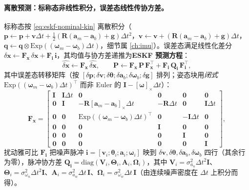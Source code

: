 \paragraph{离散预测：标称态非线性积分，误差态线性传协方差。}
标称态按 \cref{eq:eskf-nominal-kin} 离散积分（$\mathbf{p}\!\leftarrow\!\mathbf{p}+\mathbf{v}\Delta t+\tfrac12(\mathbf{R}(\mathbf{a}_m-\mathbf{a}_b)+\mathbf{g})\Delta t^2$，$\mathbf{v}\!\leftarrow\!\mathbf{v}+(\mathbf{R}(\mathbf{a}_m-\mathbf{a}_b)+\mathbf{g})\Delta t$，$\mathbf{q}\!\leftarrow\!\mathbf{q}\otimes\mathrm{Exp}((\boldsymbol{\omega}_m-\boldsymbol{\omega}_b)\Delta t)$，细节属 \cref{ch:imu}）。误差态满足线性化差分 $\delta\mathbf{x}\leftarrow\mathbf{F}_{\mathbf{x}}\,\delta\mathbf{x}+\mathbf{F}_{\mathbf{i}}\,\mathbf{i}$，其均值与协方差递推为\textbf{ESKF 预测方程}：
\begin{equation}
  \widehat{\delta\mathbf{x}}\leftarrow\mathbf{F}_{\mathbf{x}}\,\widehat{\delta\mathbf{x}},\qquad
  \mathbf{P}\leftarrow\mathbf{F}_{\mathbf{x}}\,\mathbf{P}\,\mathbf{F}_{\mathbf{x}}^\top+\mathbf{F}_{\mathbf{i}}\,\mathbf{Q}_{\mathbf{i}}\,\mathbf{F}_{\mathbf{i}}^\top,
  \label{eq:eskf-predict}
\end{equation}
其中误差态转移矩阵（按 $[\delta\mathbf{p};\delta\mathbf{v};\delta\boldsymbol{\theta};\delta\mathbf{a}_b;\delta\boldsymbol{\omega}_b;\delta\mathbf{g}]$ 排列；姿态块用\emph{闭式} $\mathrm{Exp}((\boldsymbol{\omega}_m-\boldsymbol{\omega}_b)\Delta t)^\top$ 而非 Euler 的 $\mathbf{I}-[\boldsymbol{\omega}]_\times\Delta t$）\cite{sola2017quaternion}：
\begin{equation}
  \mathbf{F}_{\mathbf{x}}=\begin{bmatrix}
  \mathbf{I}&\mathbf{I}\Delta t&\mathbf{0}&\mathbf{0}&\mathbf{0}&\mathbf{0}\\
  \mathbf{0}&\mathbf{I}&-\mathbf{R}[\mathbf{a}_m-\mathbf{a}_b]_\times\Delta t&-\mathbf{R}\Delta t&\mathbf{0}&\mathbf{I}\Delta t\\
  \mathbf{0}&\mathbf{0}&\mathrm{Exp}((\boldsymbol{\omega}_m-\boldsymbol{\omega}_b)\Delta t)^\top&\mathbf{0}&-\mathbf{I}\Delta t&\mathbf{0}\\
  \mathbf{0}&\mathbf{0}&\mathbf{0}&\mathbf{I}&\mathbf{0}&\mathbf{0}\\
  \mathbf{0}&\mathbf{0}&\mathbf{0}&\mathbf{0}&\mathbf{I}&\mathbf{0}\\
  \mathbf{0}&\mathbf{0}&\mathbf{0}&\mathbf{0}&\mathbf{0}&\mathbf{I}
  \end{bmatrix},
  \label{eq:eskf-Fx}
\end{equation}
扰动雅可比 $\mathbf{F}_{\mathbf{i}}$ 把噪声脉冲 $\mathbf{i}=[\mathbf{v}_i;\boldsymbol{\theta}_i;\mathbf{a}_i;\boldsymbol{\omega}_i]$ 映到 $\delta\mathbf{v},\delta\boldsymbol{\theta},\delta\mathbf{a}_b,\delta\boldsymbol{\omega}_b$ 四行（其余行为零），脉冲协方差 $\mathbf{Q}_{\mathbf{i}}=\mathrm{diag}(\mathbf{V}_i,\boldsymbol{\Theta}_i,\mathbf{A}_i,\boldsymbol{\Omega}_i)$，其中 $\mathbf{V}_i=\sigma_{a_n}^2\Delta t^2\mathbf{I}$、$\boldsymbol{\Theta}_i=\sigma_{\omega_n}^2\Delta t^2\mathbf{I}$、$\mathbf{A}_i=\sigma_{a_w}^2\Delta t\,\mathbf{I}$、$\boldsymbol{\Omega}_i=\sigma_{\omega_w}^2\Delta t\,\mathbf{I}$（由连续噪声密度在 $\Delta t$ 上积分而得）。
